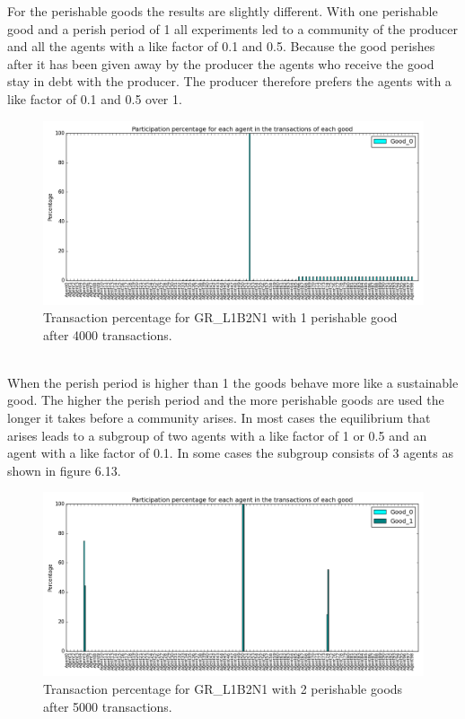 \documentclass[twoside,openright]{uva-bachelor-thesis}
\begin{document}
For the perishable goods the results are slightly different. With one perishable good and a perish period of 1 all experiments led to a community of the producer and all the agents with a like factor of 0.1 and 0.5. Because the good perishes after it has been given away by the producer the agents who receive the good stay in debt with the producer. The producer therefore prefers the agents with a like factor of 0.1 and 0.5 over 1. \\
\begin{figure}[h!]
\centering
\includegraphics[scale=0.4]{Simulation2_figures/GR_L1B2N1/Figure5_1perishable_4k}
\caption{Transaction percentage for GR\_L1B2N1 with 1 perishable good after 4000 transactions.}
\end{figure}
\\
When the perish period is higher than 1 the goods behave more like a sustainable good. The higher the perish period and the more perishable goods are used the longer it takes before a community arises. In most cases the equilibrium that arises leads to a subgroup of two agents with a like factor of 1 or 0.5 and an agent with a like factor of 0.1. In some cases the subgroup consists of 3 agents as shown in figure 6.13.\\
\begin{figure}[h!]
\centering
\includegraphics[scale=0.4]{Simulation2_figures/GR_L1B2N1/Figure6_2perishable_5k} 
\caption{Transaction percentage for GR\_L1B2N1 with 2 perishable goods after 5000 transactions.}
\end{figure}
\end{document}
